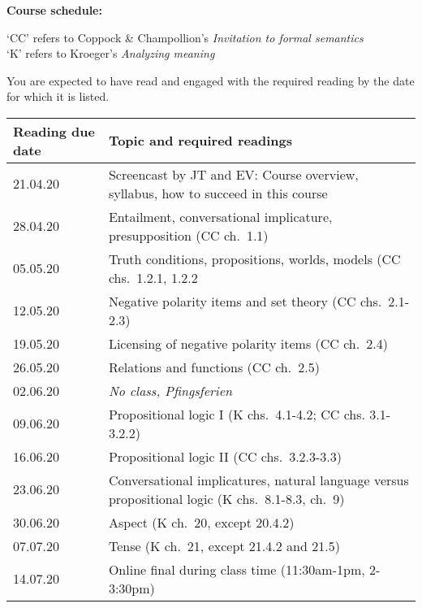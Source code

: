 \documentclass[11pt,fleqn,a4]{article}
\newcommand{\6}{\mbox{$[\hspace*{-.6mm}[$}}
\newcommand{\9}{\mbox{$]\hspace*{-.6mm}]$}}
\begin{document}
{\bf Course schedule:} 

`CC' refers to Coppock \& Champollion's {\em Invitation to formal semantics}
\\
`K' refers to Kroeger's {\em Analyzing meaning}

You are expected to have read and engaged with the required reading by the date for which it is listed.

\begin{longtable}{l l}
{\bf Reading due date} & {\bf Topic and required readings}  \\ \hline

21.04.20 & Screencast by JT and EV: Course overview, syllabus, how to succeed in this course   \\ 

28.04.20 & Entailment, conversational implicature, presupposition (CC ch.\ 1.1) \\

05.05.20 & Truth conditions, propositions, worlds, models (CC chs.\ 1.2.1, 1.2.2 \\

12.05.20 & Negative polarity items and set theory (CC chs.\ 2.1-2.3) \\

19.05.20 & Licensing of negative polarity items (CC ch.\ 2.4) \\

26.05.20 & Relations and functions (CC ch.\ 2.5) \\

02.06.20 & {\em No class, Pfingsferien} \\

09.06.20 & Propositional logic I (K chs.\ 4.1-4.2; CC chs. 3.1-3.2.2)\\

16.06.20 & Propositional logic II (CC chs.\ 3.2.3-3.3) \\

23.06.20 & Conversational implicatures, natural language versus propositional logic (K chs.\ 8.1-8.3, ch.\ 9) \\

30.06.20 & Aspect (K ch.\ 20, except 20.4.2) \\

07.07.20 & Tense (K ch.\ 21, except 21.4.2 and 21.5) \\ 

14.07.20 & Online final during class time (11:30am-1pm, 2-3:30pm) \\

\hline

\end{longtable}
\end{document}

